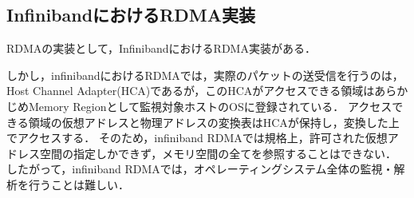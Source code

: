 
\subsection{InfinibandにおけるRDMA実装}


RDMAの実装として，Infiniband\cite{islam2012high}におけるRDMA実装がある．

しかし，infinibandにおけるRDMA\cite{infiniband-rdma}では，実際のパケットの送受信を行うのは，Host Channel Adapter(HCA)であるが，このHCAがアクセスできる領域はあらかじめMemory Regionとして監視対象ホストのOSに登録されている．
アクセスできる領域の仮想アドレスと物理アドレスの変換表はHCAが保持し，変換した上でアクセスする．
そのため，infiniband RDMAでは規格上，許可された仮想アドレス空間の指定しかできず，メモリ空間の全てを参照することはできない．
したがって，infiniband RDMAでは，オペレーティングシステム全体の監視・解析を行うことは難しい．
